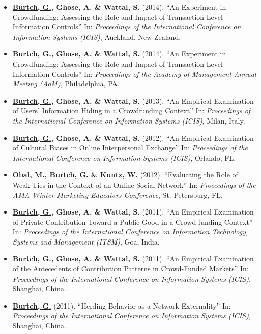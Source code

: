 \documentclass[10.5pt,letterpaper,sans]{moderncv}        %
\begin{document}
\begin{itemize}
\item \textbf{\underline{Burtch, G.}, Ghose, A. \& Wattal, S.} (2014). ``An Experiment in Crowdfunding: Assessing the Role and Impact of Transaction-Level Information Controls'' In: \textit{Proceedings of the International Conference on Information Systems (ICIS)}, Auckland, New Zealand.

\item \textbf{\underline{Burtch, G.}, Ghose, A. \& Wattal, S.} (2014). ``An Experiment in Crowdfunding: Assessing the Role and Impact of Transaction-Level Information Controls'' In: \textit{Proceedings of the Academy of Management Annual Meeting (AoM)}, Philadelphia, PA.

\item \textbf{\underline{Burtch, G.}, Ghose, A. \& Wattal, S.} (2013). ``An Empirical Examination of Users' Information Hiding in a Crowdfunding Context'' In: \textit{Proceedings of the International Conference on Information Systems (ICIS)}, Milan, Italy.

\item \textbf{\underline{Burtch, G.}, Ghose, A. \& Wattal, S.} (2012). ``An Empirical Examination of Cultural Biases in Online Interpersonal Exchange'' In: \textit{Proceedings of the International Conference on Information Systems (ICIS)}, Orlando, FL.

\item \textbf{Obal, M., \underline{Burtch, G.} \& Kuntz, W.} (2012). ``Evaluating the Role of Weak Ties in the Context of an Online Social Network'' In: \textit{Proceedings of the AMA Winter Marketing Educators Conference}, St. Petersburg, FL.

\item \textbf{\underline{Burtch, G.}, Ghose, A. \& Wattal, S.} (2011). ``An Empirical Examination of Private Contribution Toward a Public Good in a Crowd-funding Context'' In: \textit{Proceedings of the International Conference on Information Technology, Systems and Management (ITSM)}, Goa, India.

\item \textbf{\underline{Burtch, G.}, Ghose, A. \& Wattal, S.} (2011). ``An Empirical Examination of the Antecedents of Contribution Patterns in Crowd-Funded Markets'' In: \textit{Proceedings of the International Conference on Information Systems (ICIS)}, Shanghai, China.

\item \textbf{\underline{Burtch, G.}} (2011). ``Herding Behavior as a Network Externality'' In: \textit{Proceedings of the International Conference on Information Systems (ICIS)}, Shanghai, China.


\end{itemize}
\end{document}
